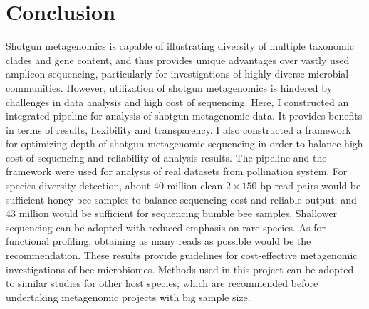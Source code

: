 \documentclass[11pt]{article}
\begin{document}
\section{Conclusion}
Shotgun metagenomics is capable of illustrating diversity of multiple taxonomic clades and gene content, and thus provides unique advantages over vastly used amplicon sequencing, particularly for investigations of highly diverse microbial communities. 
However, utilization of shotgun metagenomics is hindered by challenges in data analysis and high cost of sequencing. 
Here, I constructed an integrated pipeline for analysis of shotgun metagenomic data. 
It provides benefits in terms of results, flexibility and transparency. 
I also constructed a framework for optimizing depth of shotgun metagenomic sequencing in order to balance high cost of sequencing and reliability of analysis results. 
The pipeline and the framework were used for analysis of real datasets from pollination system. 
For species diversity detection, about 40 million clean $2 \times 150$ bp read pairs would be sufficient honey bee samples to balance sequencing cost and reliable output; and 43 million would be sufficient for sequencing bumble bee samples. 
Shallower sequencing can be adopted with reduced emphasis on rare species. 
As for functional profiling, obtaining as many reads as possible would be the recommendation. 
These results provide guidelines for cost-effective metagenomic investigations of bee microbiomes. 
Methods used in this project can be adopted to similar studies for other host species, which are recommended before undertaking metagenomic projects with big sample size. 

\end{document}
